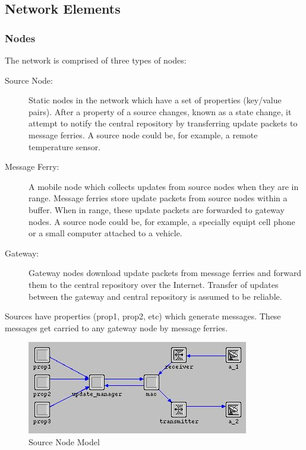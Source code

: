\subsection{Network Elements}



\subsubsection{Nodes}

The network is comprised of three types of nodes:

\begin{description}

\item[Source Node: ] 
Static nodes in the network which have a set of properties (key/value pairs).
After a property of a source changes, known as a state change, it attempt to notify the central repository by transferring update packets to message ferries.
A source node could be, for example, a remote temperature sensor.
\item[Message Ferry: ] 
A mobile node which collects updates from source nodes when they are in range.
Message ferries store update packets from source nodes within a buffer. 
When in range, these update packets are forwarded to gateway nodes.
A source node could be, for example, a specially equipt cell phone or a small computer attached to a vehicle. 
\item[Gateway: ]
Gateway nodes download update packets from message ferries and forward them to the central repository over the Internet.
Transfer of updates between the gateway and central repository is assumed to be reliable. 

\end{description}


Sources have properties (prop1, prop2, etc) which generate messages. These messages get carried to any gateway node by message ferries.

\begin{figure}[h]
    \centering
    \includegraphics[width=.5\textwidth]{images/source}
    \caption{Source Node Model}
    \label{fig:source}
\end{figure}

